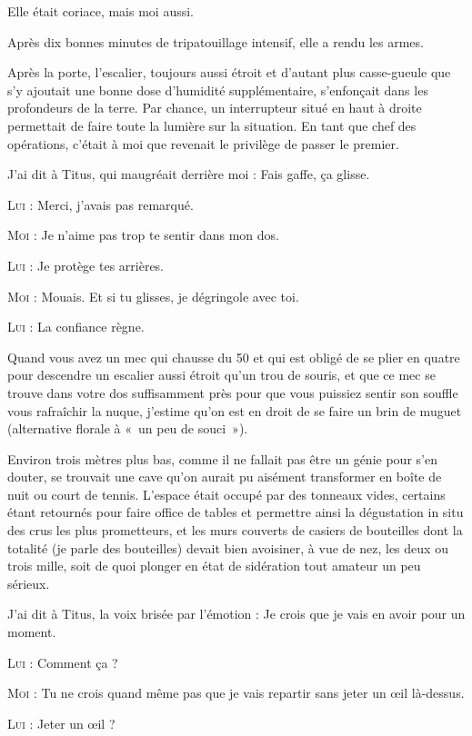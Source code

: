 Elle était coriace, mais moi aussi.

Après dix bonnes minutes de tripatouillage intensif, elle a rendu les armes.

Après la porte, l’escalier, toujours aussi étroit et d’autant plus casse-gueule que s’y ajoutait une bonne dose d’humidité supplémentaire, s’enfonçait dans les profondeurs de la terre. Par chance, un interrupteur situé en haut à droite permettait de faire toute la lumière sur la situation. En tant que chef des opérations, c’était à moi que revenait le privilège de passer le premier.

J’ai dit à Titus, qui maugréait derrière moi : Fais gaffe, ça glisse.

\textsc{Lui} : Merci, j’avais pas remarqué.

\textsc{Moi} : Je n’aime pas trop te sentir dans mon dos.

\textsc{Lui} : Je protège tes arrières.

\textsc{Moi} : Mouais. Et si tu glisses, je dégringole avec toi.

\textsc{Lui} : La confiance règne.

Quand vous avez un mec qui chausse du 50 et qui est obligé de se plier en quatre pour descendre un escalier aussi étroit qu’un trou de souris, et que ce mec se trouve dans votre dos suffisamment près pour que vous puissiez sentir son souffle vous rafraîchir la nuque, j’estime qu’on est en droit de se faire un brin de muguet (alternative florale à «~un peu de souci~»).

Environ trois mètres plus bas, comme il ne fallait pas être un génie pour s’en douter, se trouvait une cave qu’on aurait pu aisément transformer en boîte de nuit ou court de tennis. L’espace était occupé par des tonneaux vides, certains étant retournés pour faire office de tables et permettre ainsi la dégustation in situ des crus les plus prometteurs, et les murs couverts de casiers de bouteilles dont la totalité (je parle des bouteilles) devait bien avoisiner, à vue de nez, les deux ou trois mille, soit de quoi plonger en état de sidération tout amateur un peu sérieux.

J’ai dit à Titus, la voix brisée par l’émotion : Je crois que je vais en avoir pour un moment.

\textsc{Lui} : Comment ça ?

\textsc{Moi} : Tu ne crois quand même pas que je vais repartir sans jeter un œil là-dessus.

\textsc{Lui} : Jeter un œil ?

